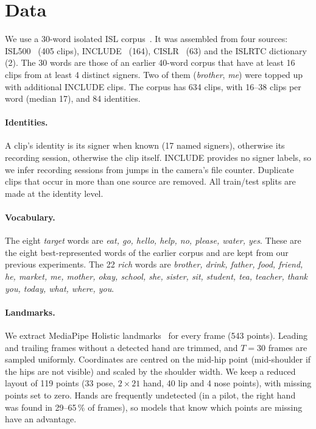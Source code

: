 \documentclass[11pt]{article}
\begin{document}
\section{Data}\label{sec:data}

We use a 30-word isolated ISL corpus~\citep{gupta2026isl30}. It was assembled from four sources:
ISL500~\citep{isl500} (405 clips), INCLUDE~\citep{sridhar2020include} (164),
CISLR~\citep{joshi2022cislr} (63) and the ISLRTC dictionary~\citep{islrtc} (2). The 30 words
are those of an earlier 40-word corpus that have at least 16 clips from at least 4 distinct
signers. Two of them (\emph{brother}, \emph{me}) were topped up with additional INCLUDE
clips. The corpus has 634 clips, with 16--38 clips per word (median 17), and 84 identities.

\paragraph{Identities.}
A clip's identity is its signer when known (17 named signers), otherwise its recording
session, otherwise the clip itself. INCLUDE provides no signer labels, so we infer recording
sessions from jumps in the camera's file counter. Duplicate clips that occur in more than
one source are removed. All train/test splits are made at the identity level.

\paragraph{Vocabulary.}
The eight \emph{target} words are \emph{eat, go, hello, help, no, please, water, yes}. These are
the eight best-represented words of the earlier corpus and are kept from our previous
experiments. The 22 \emph{rich} words are \emph{brother, drink, father, food, friend, he,
market, me, mother, okay, school, she, sister, sit, student, tea, teacher, thank you, today,
what, where, you}.

\paragraph{Landmarks.}
We extract MediaPipe Holistic landmarks~\citep{lugaresi2019mediapipe} for every frame
(543 points). Leading and trailing frames without a detected hand are trimmed, and $T=30$
frames are sampled uniformly. Coordinates are centred on the mid-hip point (mid-shoulder if
the hips are not visible) and scaled by the shoulder width. We keep a reduced layout of 119
points (33 pose, $2\times21$ hand, 40 lip and 4 nose points), with missing points set to
zero. Hands are frequently undetected (in a pilot, the right hand was found in 29--65\,\% of
frames), so models that know which points are missing have an advantage.
\end{document}
